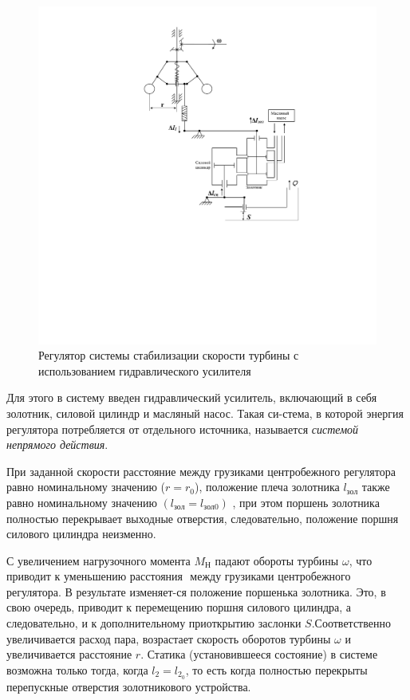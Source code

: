 \begin{figure}[p]
	\centering
	\includegraphics[scale=0.99]{images/TheTurbineController}
	\caption{Регулятор системы стабилизации скорости турбины 
		с использованием гидравлического усилителя}
	\label{fig:theturbinecontroller}
\end{figure}

Для этого в систему введен гидравлический усилитель, включающий в себя золотник, силовой цилиндр и масляный насос. Такая си-стема, в которой энергия регулятора потребляется от отдельного источника, называется \textit{системой непрямого действия}.

При заданной скорости расстояние между грузиками центробежного регулятора равно номинальному значению ($ r=r_{0} $), положение плеча золотника $ l_{зол} $ также равно номинальному значению $ (l_{зол}=l_{зол 0}) $ , при этом поршень золотника полностью перекрывает выходные отверстия, следовательно, положение поршня силового цилиндра неизменно.

С увеличением нагрузочного момента $ M_{Н} $ падают обороты турбины $ \omega $, что приводит к уменьшению расстояния $ $
между грузиками центробежного регулятора. В результате изменяет-ся положение поршенька золотника. Это, в свою очередь, приводит к перемещению поршня силового цилиндра, а следовательно, и к дополнительному приоткрытию заслонки $ S $.Соответственно увеличивается расход пара, возрастает скорость оборотов турбины $ \omega $ и увеличивается расстояние $ r $. Статика (установившееся состояние) в системе возможна только тогда, когда
$ l_{2}=l_{2_{0}} $, то есть когда полностью перекрыты перепускные отверстия золотникового устройства.

